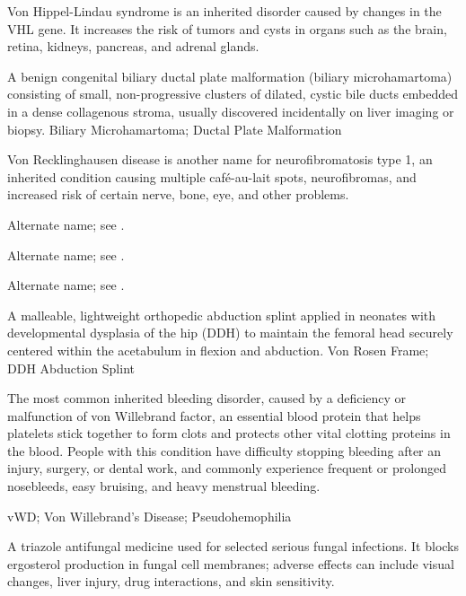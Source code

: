  Von Hippel-Lindau syndrome is an inherited disorder caused by changes in the VHL gene. It increases the risk of tumors and cysts in organs such as the brain, retina, kidneys, pancreas, and adrenal glands.

 A benign congenital biliary ductal plate malformation (biliary microhamartoma) consisting of small, non-progressive clusters of dilated, cystic bile ducts embedded in a dense collagenous stroma, usually discovered incidentally on liver imaging or biopsy.
\synonyms
Biliary Microhamartoma; Ductal Plate Malformation

 Von Recklinghausen disease is another name for neurofibromatosis type 1, an inherited condition causing multiple café-au-lait spots, neurofibromas, and increased risk of certain nerve, bone, eye, and other problems.

 Alternate name; see .

 Alternate name; see .

 Alternate name; see .

 A malleable, lightweight orthopedic abduction splint applied in neonates with developmental dysplasia of the hip (DDH) to maintain the femoral head securely centered within the acetabulum in flexion and abduction.
\synonyms
Von Rosen Frame; DDH Abduction Splint

 The most common inherited bleeding disorder, caused by a deficiency or malfunction of von Willebrand factor, an essential blood protein that helps platelets stick together to form clots and protects other vital clotting proteins in the blood. People with this condition have difficulty stopping bleeding after an injury, surgery, or dental work, and commonly experience frequent or prolonged nosebleeds, easy bruising, and heavy menstrual bleeding.

\synonyms
vWD; Von Willebrand's Disease; Pseudohemophilia

 A triazole antifungal medicine used for selected serious fungal infections. It blocks ergosterol production in fungal cell membranes; adverse effects can include visual changes, liver injury, drug interactions, and skin sensitivity.

